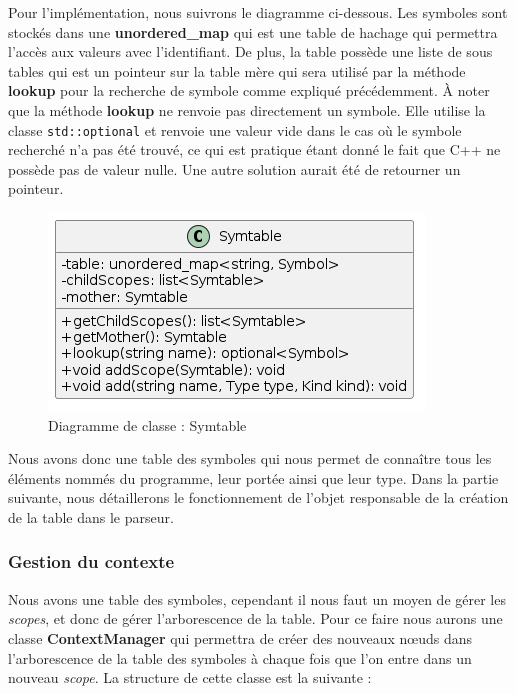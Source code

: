 \documentclass[a4paper]{article}%
\begin{document}
Pour l'implémentation, nous suivrons le diagramme ci-dessous. Les symboles sont
stockés dans une \textbf{unordered\_map} qui est une table de hachage qui
permettra l'accès aux valeurs avec l'identifiant. De plus, la table
possède une liste de sous tables qui est un pointeur sur la table mère qui sera
utilisé par la méthode \textbf{lookup} pour la recherche de symbole comme
expliqué précédemment. À noter que la méthode \textbf{lookup} ne renvoie pas
directement un symbole. Elle utilise la classe \lstinline{std::optional} et
renvoie une valeur vide dans le cas où le symbole recherché n'a pas été trouvé,
ce qui est pratique étant donné le fait que C++ ne possède pas de valeur nulle.
Une autre solution aurait été de retourner un pointeur.

\begin{figure}[h!]
  \begin{center}
  \includegraphics[scale=0.5]{../ressources/diagrams/symtable2.png}
  \caption{Diagramme de classe : Symtable}
  \end{center}
\end{figure}

Nous avons donc une table des symboles qui nous permet de connaître tous les
éléments nommés du programme, leur portée ainsi que leur type. Dans la partie
suivante, nous détaillerons le fonctionnement de l'objet responsable de la
création de la table dans le parseur.

\clearpage
\subsubsection*{Gestion du contexte}

Nous avons une table des symboles, cependant il nous faut un moyen de gérer les
\textit{scopes}, et donc de gérer l'arborescence de la table. Pour ce faire nous
aurons une classe \textbf{ContextManager} qui permettra de créer des nouveaux
nœuds dans l'arborescence de la table des symboles à chaque fois que l'on entre
dans un nouveau \textit{scope}. La structure de cette classe est la suivante :
\end{document}

